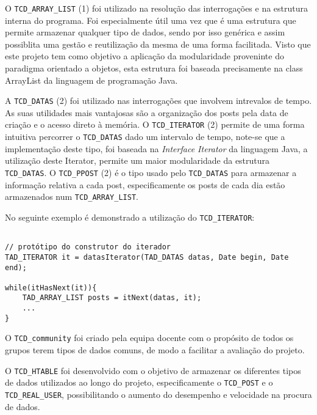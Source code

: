 \documentclass[4apaper]{report}
\begin{document}
O \texttt{TCD\_ARRAY\_LIST} (1) foi utilizado na resolução das interrogações e na estrutura interna do programa. Foi especialmente útil uma vez que é uma estrutura que permite armazenar qualquer tipo de dados, sendo por isso genérica e assim possiblita uma gestão e reutilização da mesma de uma forma facilitada. Visto que este projeto tem como objetivo a aplicação da modularidade proveninte do paradigma orientado a objetos, esta estrutura foi baseada precisamente na class ArrayList da linguagem de programação Java.\newline

A \texttt{TCD\_DATAS} (2) foi utilizado nas interrogações que involvem intrevalos de tempo. As suas utilidades mais vantajosas são a organização dos posts pela data de criação e o acesso direto à memória. O \texttt{TCD\_ITERATOR} (2) permite de uma forma intuitiva percorrer o \texttt{TCD\_DATAS} dado um intervalo de tempo, note-se que a implementação deste tipo, foi baseada na \emph{Interface Iterator} da linguagem Java, a utilização deste Iterator, permite um maior modularidade da estrutura \texttt{TCD\_DATAS}. O \texttt{TCD\_PPOST} (2) é o tipo usado pelo \texttt{TCD\_DATAS} para armazenar a informação relativa a cada post, especificamente os posts de cada dia estão armazenados num \texttt{TCD\_ARRAY\_LIST}.\newline

No seguinte exemplo é demonstrado a utilização do \texttt{TCD\_ITERATOR}:

\begin{verbatim}

// protótipo do construtor do iterador
TAD_ITERATOR it = datasIterator(TAD_DATAS datas, Date begin, Date end);

while(itHasNext(it)){
    TAD_ARRAY_LIST posts = itNext(datas, it);
    ...
}

\end{verbatim}

O \texttt{TCD\_community} foi criado pela equipa docente com o propósito de todos os grupos terem tipos de dados comuns, de modo a facilitar a avaliação do projeto.\newline

O \texttt{TCD\_HTABLE} foi desenvolvido com o objetivo de armazenar os diferentes tipos de dados utilizados ao longo do projeto, especificamente o \texttt{TCD\_POST} e o \texttt{TCD\_REAL\_USER}, possibilitando o aumento do desempenho e velocidade na procura de dados.\newline
\end{document}
